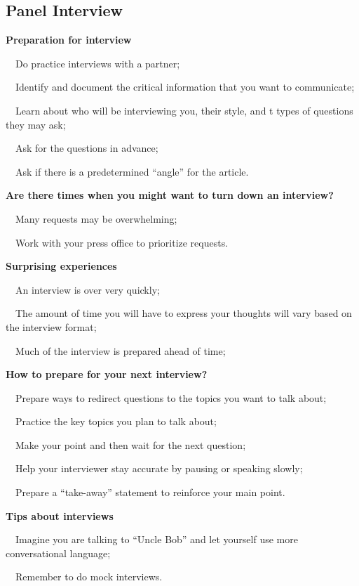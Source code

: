 \documentclass[a4paper, 12pt]{article}
\begin{document}
\subsection{Panel Interview}

\textbf{Preparation for interview}
\par\ \textbullet\ Do practice interviews with a partner;
\par\ \textbullet\ Identify and document the critical information that you want to communicate;
\par\ \textbullet\ Learn about who will be interviewing you, their style, and t types of questions they may ask;
\par\ \textbullet\ Ask for the questions in advance;
\par\ \textbullet\ Ask if there is a predetermined ``angle'' for the article.

\textbf{Are there times when you might want to turn down an interview?}
\par\ \textbullet\ Many requests may be overwhelming;
\par\ \textbullet\ Work with your press office to prioritize requests.

\newpage\textbf{Surprising experiences}
\par\ \textbullet\ An interview is over very quickly;
\par\ \textbullet\ The amount of time you will have to express your thoughts will vary based on the interview format;
\par\ \textbullet\ Much of the interview is prepared ahead of time;

\textbf{How to prepare for your next interview?}
\par\ \textbullet\ Prepare ways to redirect questions to the topics you want to talk about;
\par\ \textbullet\ Practice the key topics you plan to talk about;
\par\ \textbullet\ Make your point and then wait for the next question;
\par\ \textbullet\ Help your interviewer stay accurate by pausing or speaking slowly;
\par\ \textbullet\ Prepare a ``take-away'' statement to reinforce your main point.

\textbf{Tips about interviews}
\par\ \textbullet\ Imagine you are talking to ``Uncle Bob'' and let yourself use more conversational language;
\par\ \textbullet\ Remember to do mock interviews.
\end{document}
